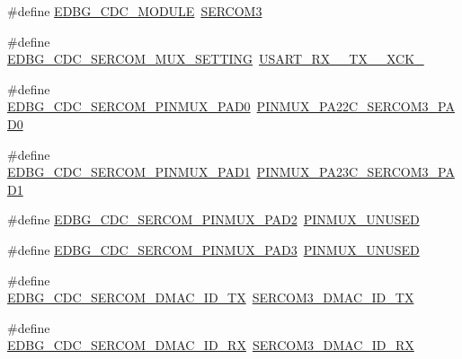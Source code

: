 \begin{DoxyCompactItemize}
\item 
\#define \mbox{\hyperlink{group__samd21__xplained__pro__features__group_gaf0fcea2c93da3103a5034f7acf880199}{E\+D\+B\+G\+\_\+\+C\+D\+C\+\_\+\+M\+O\+D\+U\+LE}}~\mbox{\hyperlink{group___s_a_m_d21_j18_a__base_gac9f8240be5a40b46cb09617323ebc7e3}{S\+E\+R\+C\+O\+M3}}
\item 
\#define \mbox{\hyperlink{group__samd21__xplained__pro__features__group_gaf280711d231595500e625f8bd55b2f86}{E\+D\+B\+G\+\_\+\+C\+D\+C\+\_\+\+S\+E\+R\+C\+O\+M\+\_\+\+M\+U\+X\+\_\+\+S\+E\+T\+T\+I\+NG}}~\mbox{\hyperlink{group__asfdoc__sam0__sercom__usart__group_gga87bbdb9f7edb3f1866aeb498bf7c9077ac937b1e1063cc3d094c4534c022af703}{U\+S\+A\+R\+T\+\_\+\+R\+X\+\_\+\_\+\+T\+X\+\_\+\_\+\+X\+C\+K\+\_}}
\item 
\#define \mbox{\hyperlink{group__samd21__xplained__pro__features__group_gaf52beac6e5e72322ef2a4efc0f0061fd}{E\+D\+B\+G\+\_\+\+C\+D\+C\+\_\+\+S\+E\+R\+C\+O\+M\+\_\+\+P\+I\+N\+M\+U\+X\+\_\+\+P\+A\+D0}}~\mbox{\hyperlink{pio_2samd21j18a_8h_a2dc12737bd31027da2b88c88ddf2f480}{P\+I\+N\+M\+U\+X\+\_\+\+P\+A22\+C\+\_\+\+S\+E\+R\+C\+O\+M3\+\_\+\+P\+A\+D0}}
\item 
\#define \mbox{\hyperlink{group__samd21__xplained__pro__features__group_gaa26f39433a2bdb405244a93fc4a9a09f}{E\+D\+B\+G\+\_\+\+C\+D\+C\+\_\+\+S\+E\+R\+C\+O\+M\+\_\+\+P\+I\+N\+M\+U\+X\+\_\+\+P\+A\+D1}}~\mbox{\hyperlink{pio_2samd21j18a_8h_a5bafe5c3611ad1e03fc59315a75d59b9}{P\+I\+N\+M\+U\+X\+\_\+\+P\+A23\+C\+\_\+\+S\+E\+R\+C\+O\+M3\+\_\+\+P\+A\+D1}}
\item 
\#define \mbox{\hyperlink{group__samd21__xplained__pro__features__group_ga1ad050d87b5fbd7ff982782cdd690259}{E\+D\+B\+G\+\_\+\+C\+D\+C\+\_\+\+S\+E\+R\+C\+O\+M\+\_\+\+P\+I\+N\+M\+U\+X\+\_\+\+P\+A\+D2}}~\mbox{\hyperlink{group__asfdoc__sam0__sercom__usart__group_gaffde9ff712058ef836127e1f3368889e}{P\+I\+N\+M\+U\+X\+\_\+\+U\+N\+U\+S\+ED}}
\item 
\#define \mbox{\hyperlink{group__samd21__xplained__pro__features__group_gadafc03032e3b6cbd5ad8f2030a86d9be}{E\+D\+B\+G\+\_\+\+C\+D\+C\+\_\+\+S\+E\+R\+C\+O\+M\+\_\+\+P\+I\+N\+M\+U\+X\+\_\+\+P\+A\+D3}}~\mbox{\hyperlink{group__asfdoc__sam0__sercom__usart__group_gaffde9ff712058ef836127e1f3368889e}{P\+I\+N\+M\+U\+X\+\_\+\+U\+N\+U\+S\+ED}}
\item 
\#define \mbox{\hyperlink{group__samd21__xplained__pro__features__group_gabafb5d80e38ef219cb0b766044a18a56}{E\+D\+B\+G\+\_\+\+C\+D\+C\+\_\+\+S\+E\+R\+C\+O\+M\+\_\+\+D\+M\+A\+C\+\_\+\+I\+D\+\_\+\+TX}}~\mbox{\hyperlink{sercom3_8h_aef51e5dfb71fb870b9badb14f6bc0a4f}{S\+E\+R\+C\+O\+M3\+\_\+\+D\+M\+A\+C\+\_\+\+I\+D\+\_\+\+TX}}
\item 
\#define \mbox{\hyperlink{group__samd21__xplained__pro__features__group_gaf82cc8d180b81a0cd53a6508da573ca2}{E\+D\+B\+G\+\_\+\+C\+D\+C\+\_\+\+S\+E\+R\+C\+O\+M\+\_\+\+D\+M\+A\+C\+\_\+\+I\+D\+\_\+\+RX}}~\mbox{\hyperlink{sercom3_8h_a4616fd14bd4cebf521dbb5682d2160fe}{S\+E\+R\+C\+O\+M3\+\_\+\+D\+M\+A\+C\+\_\+\+I\+D\+\_\+\+RX}}
\end{DoxyCompactItemize}



